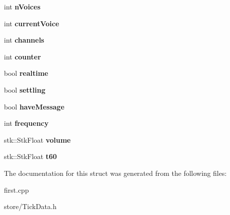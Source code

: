 \begin{DoxyCompactItemize}
\item 
int {\bfseries n\+Voices}\hypertarget{structTickData_ac53a7ecd6dfff24019bfb607202f6024}{}\label{structTickData_ac53a7ecd6dfff24019bfb607202f6024}

\item 
int {\bfseries current\+Voice}\hypertarget{structTickData_a620ca81cff77e4cdaf0025b73bc37e61}{}\label{structTickData_a620ca81cff77e4cdaf0025b73bc37e61}

\item 
int {\bfseries channels}\hypertarget{structTickData_ad147869433dc1b3526aa9f4dbb3b4cc5}{}\label{structTickData_ad147869433dc1b3526aa9f4dbb3b4cc5}

\item 
int {\bfseries counter}\hypertarget{structTickData_a54ba17f6bb83ce8efe0758614221f026}{}\label{structTickData_a54ba17f6bb83ce8efe0758614221f026}

\item 
bool {\bfseries realtime}\hypertarget{structTickData_aa60016ecb88b0bdae8395aa7517a6f1f}{}\label{structTickData_aa60016ecb88b0bdae8395aa7517a6f1f}

\item 
bool {\bfseries settling}\hypertarget{structTickData_a4682f375c65eb79d9166933ec9c79c2b}{}\label{structTickData_a4682f375c65eb79d9166933ec9c79c2b}

\item 
bool {\bfseries have\+Message}\hypertarget{structTickData_a142d947db0ab6e66f8f912c51a4bafdb}{}\label{structTickData_a142d947db0ab6e66f8f912c51a4bafdb}

\item 
int {\bfseries frequency}\hypertarget{structTickData_ade8d551a52ad93b8f056bf5da813c64c}{}\label{structTickData_ade8d551a52ad93b8f056bf5da813c64c}

\item 
stk\+::\+Stk\+Float {\bfseries volume}\hypertarget{structTickData_a81bc42e25163a7afb9725153fac3d713}{}\label{structTickData_a81bc42e25163a7afb9725153fac3d713}

\item 
stk\+::\+Stk\+Float {\bfseries t60}\hypertarget{structTickData_a9916301f9f675256327e1ac0bdb8f9f4}{}\label{structTickData_a9916301f9f675256327e1ac0bdb8f9f4}

\end{DoxyCompactItemize}


The documentation for this struct was generated from the following files\+:\begin{DoxyCompactItemize}
\item 
first.\+cpp\item 
store/Tick\+Data.\+h\end{DoxyCompactItemize}
